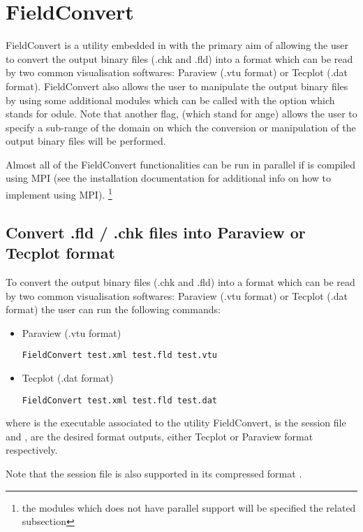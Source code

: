 \section{FieldConvert}
\label{s:utilities:fieldconvert}
FieldConvert is a utility embedded in \nekpp with the primary 
aim of allowing the user to convert the \nekpp output binary files 
(.chk and .fld) into a format which can be read by two common 
visualisation softwares: Paraview (.vtu format) or Tecplot (.dat 
format). FieldConvert also allows the user to manipulate the 
\nekpp output binary files by using some additional modules 
which can be called with the option  which stands 
for odule. Note that another flag,  (which stand for 
ange) allows the user to specify a sub-range of the domain 
on which the conversion or manipulation of the \nekpp output binary
files will be performed. 

Almost all of the FieldConvert functionalities can be run in parallel if \nekpp 
is compiled using MPI (see the installation documentation for additional 
info on how to implement \nekpp using MPI). \footnote{the modules which 
does not have parallel support will be specified the related subsection}
%
%
%
\subsection{Convert .fld / .chk files into Paraview or Tecplot format}
\label{s:utilities:fieldconvert:sub:convert}
To convert the \nekpp output binary files (.chk and .fld) into a format 
which can be read by two common visualisation softwares: Paraview 
(.vtu format) or Tecplot (.dat format) the user can run the following 
commands:
%
\begin{itemize}
\item Paraview (.vtu format)
%
\begin{lstlisting}[style=BashInputStyle]
FieldConvert test.xml test.fld test.vtu
\end{lstlisting}
%
\item Tecplot (.dat format)
%
\begin{lstlisting}[style=BashInputStyle]
FieldConvert test.xml test.fld test.dat
\end{lstlisting}
%
\end{itemize}
%
where  is the executable associated to the utility 
FieldConvert,  is the session file and , 
 are the desired format outputs, either Tecplot or 
Paraview format respectively. 
%
\begin{tipbox}
Note that the session file is also supported 
in its compressed format .
\end{tipbox}
%
%
%
